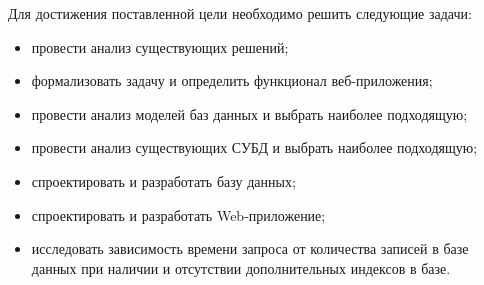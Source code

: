 Для достижения поставленной цели необходимо решить следующие задачи:
\begin{itemize}
	\item провести анализ существующих решений;
	\item формализовать задачу и определить функционал веб-приложения;
	\item провести анализ моделей баз данных и выбрать наиболее подходящую;
	\item провести анализ существующих СУБД и выбрать наиболее подходящую;
	\item спроектировать и разработать базу данных;
	\item спроектировать и разработать Web-приложение;
	\item исследовать зависимость времени запроса от количества записей в базе данных при наличии и отсутствии дополнительных индексов в базе.
\end{itemize}
